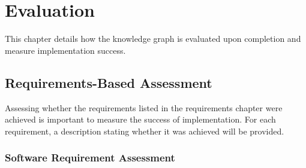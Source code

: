 \chapter{Evaluation}
This chapter details how the knowledge graph is evaluated upon completion and measure implementation success.

\section{Requirements-Based Assessment}
\hspace{0.5cm} Assessing whether the requirements listed in the requirements chapter were achieved is important to measure the success of implementation. For each requirement, a description stating whether it was achieved will be provided. 

\subsection{Software Requirement Assessment}
